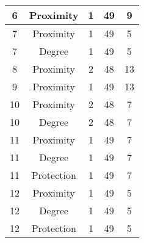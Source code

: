\documentclass[results.tex]{subfiles}
\begin{document}
\begin{center}
\begin{tabular}{| c || c | c | c | c |}
            \hline
            6                       & Proximity                    & 1                      & 49                      & 9                    \\
            \hline
            7                       & Proximity                    & 1                      & 49                      & 5                    \\
            \hline
            7                       & Degree                       & 1                      & 49                      & 5                    \\
            \hline
            8                       & Proximity                    & 2                      & 48                      & 13                   \\
            \hline
            9                       & Proximity                    & 1                      & 49                      & 13                   \\
            \hline
            10                      & Proximity                    & 2                      & 48                      & 7                    \\
            \hline
            10                      & Degree                       & 2                      & 48                      & 7                    \\
            \hline
            11                      & Proximity                    & 1                      & 49                      & 7                    \\
            \hline
            11                      & Degree                       & 1                      & 49                      & 7                    \\
            \hline
            11                      & Protection                   & 1                      & 49                      & 7                    \\
            \hline
            12                      & Proximity                    & 1                      & 49                      & 5                    \\
            \hline
            12                      & Degree                       & 1                      & 49                      & 5                    \\
            \hline
            12                      & Protection                   & 1                      & 49                      & 5                    \\

\end{tabular}
\end{center}
\end{document}

